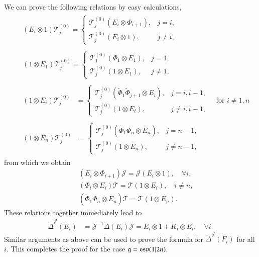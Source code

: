 \documentclass[12pt]{amsart}
\theoremstyle{definition}
\theoremstyle{remark}
\numberwithin{equation}{section}
\begin{document}
We can prove the following relations by easy calculations,
\begin{eqnarray}
\label{eq:eti-L}
&&\begin{aligned}
(E_i\otimes 1){{\mathscr T}}_j^{(0)}=\begin{cases}
{{\mathscr T}}_j^{(0)}(E_i\otimes \Phi_{i+1}), & j=i,\\
{{\mathscr T}}_j^{(0)}(E_i\otimes 1),&j\ne i,
\end{cases}
\end{aligned}\\
\label{eq:et1-L}
&&\begin{aligned}
(1\otimes E_1){{\mathscr T}}_j^{(0)}=\begin{cases}
{{\mathscr T}}_1^{(0)}(\Phi_1\otimes E_1), & j=1,\\
{{\mathscr T}}_j^{(0)}(1\otimes E_1),&j\ne 1,
\end{cases}
\end{aligned}\\
\label{eq:eti}
&&\begin{aligned}
(1\otimes E_i){{\mathscr T}}_j^{(0)}&=\begin{cases}
{{\mathscr T}}_j^{(0)}(\tilde{\Phi}_1\tilde{\Phi}_{j+1}\otimes E_i), & j=i, i-1,\\
{{\mathscr T}}_j^{(0)}(1\otimes E_i),&j\ne i, i-1,
\end{cases}\quad \text{for $i\ne 1, n$}
\end{aligned}\\
\label{eq:etn}
&&\begin{aligned}
(1\otimes E_n){{\mathscr T}}^{(0)}_j&=\begin{cases}
{{\mathscr T}}^{(0)}_j(\tilde{\Phi}_1 \Phi _n\otimes E_n), & j= n-1,\\
{{\mathscr T}}^{(0)}_j(1\otimes E_n),&j\ne n-1,
\end{cases}
\end{aligned}
\end{eqnarray}
from which we obtain
\begin{eqnarray*}
&&(E_i\otimes  \Phi_{i+1}){{\mathcal J}}={{\mathcal J}}(E_i\otimes 1), \quad \forall i, \\
&&(\Phi_i\otimes E_i){{\mathscr T}}={{\mathscr T}}(1\otimes E_i), \quad i\ne n, \\
&&(\tilde{\Phi}_1 \Phi _n\otimes E_n){{\mathscr T}}={{\mathscr T}}(1\otimes E_n).
\end{eqnarray*}
These relations together immediately lead to
\[\begin{aligned}
{\tilde{\Delta}}^{{\mathcal J}}(E_i)&={{\mathcal J}}^{-1}{\tilde{\Delta}} (E_i) {{\mathcal J}}=E_i\otimes 1+ K_i\otimes E_i, \quad \forall i.
\end{aligned}\]
Similar arguments as above can be used to prove the formula for ${\tilde{\Delta}}^{{\mathcal J}}(F_i)$ for all $i$. This completes the proof for the case  ${{\mathfrak g}}={{\rm\mathfrak{osp}}}(1|2n)$.
\end{document}
